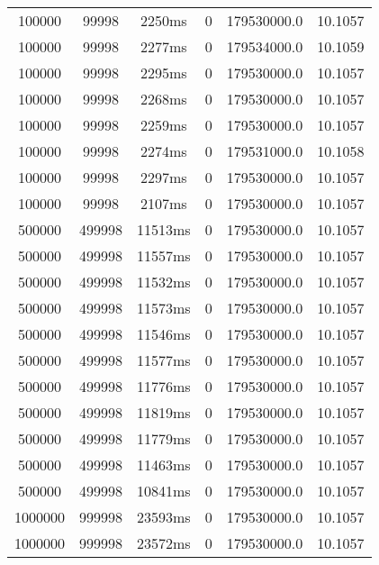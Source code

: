 \documentclass[./main.tex]{subfiles}
\begin{document}
\begin{table}
\begin{tabular}{ c | c | c | c | c | c }
        \rowcolor{lightgray} 100000 & 99998 & 2250ms & 0 & 179530000.0 & 10.1057 \\
        100000 & 99998 & 2277ms & 0 & 179534000.0 & 10.1059 \\
        \rowcolor{lightgray} 100000 & 99998 & 2295ms & 0 & 179530000.0 & 10.1057 \\
        \rowcolor{lightgray} 100000 & 99998 & 2268ms & 0 & 179530000.0 & 10.1057 \\
        \rowcolor{lightgray} 100000 & 99998 & 2259ms & 0 & 179530000.0 & 10.1057 \\
        100000 & 99998 & 2274ms & 0 & 179531000.0 & 10.1058 \\
        \rowcolor{lightgray} 100000 & 99998 & 2297ms & 0 & 179530000.0 & 10.1057 \\
        \rowcolor{lightgray} 100000 & 99998 & 2107ms & 0 & 179530000.0 & 10.1057 \\
        \hline
        \rowcolor{lightgray} 500000 & 499998 & 11513ms & 0 & 179530000.0 & 10.1057 \\
        \rowcolor{lightgray} 500000 & 499998 & 11557ms & 0 & 179530000.0 & 10.1057 \\
        \rowcolor{lightgray} 500000 & 499998 & 11532ms & 0 & 179530000.0 & 10.1057 \\
        \rowcolor{lightgray} 500000 & 499998 & 11573ms & 0 & 179530000.0 & 10.1057 \\
        \rowcolor{lightgray} 500000 & 499998 & 11546ms & 0 & 179530000.0 & 10.1057 \\
        \rowcolor{lightgray} 500000 & 499998 & 11577ms & 0 & 179530000.0 & 10.1057 \\
        \rowcolor{lightgray} 500000 & 499998 & 11776ms & 0 & 179530000.0 & 10.1057 \\
        \rowcolor{lightgray} 500000 & 499998 & 11819ms & 0 & 179530000.0 & 10.1057 \\
        \rowcolor{lightgray} 500000 & 499998 & 11779ms & 0 & 179530000.0 & 10.1057 \\
        \rowcolor{lightgray} 500000 & 499998 & 11463ms & 0 & 179530000.0 & 10.1057 \\
        \rowcolor{lightgray} 500000 & 499998 & 10841ms & 0 & 179530000.0 & 10.1057 \\
        \hline
        \rowcolor{lightgray} 1000000 & 999998 & 23593ms & 0 & 179530000.0 & 10.1057 \\
        \rowcolor{lightgray} 1000000 & 999998 & 23572ms & 0 & 179530000.0 & 10.1057 \\

\end{tabular}
\end{table}
\end{document}
